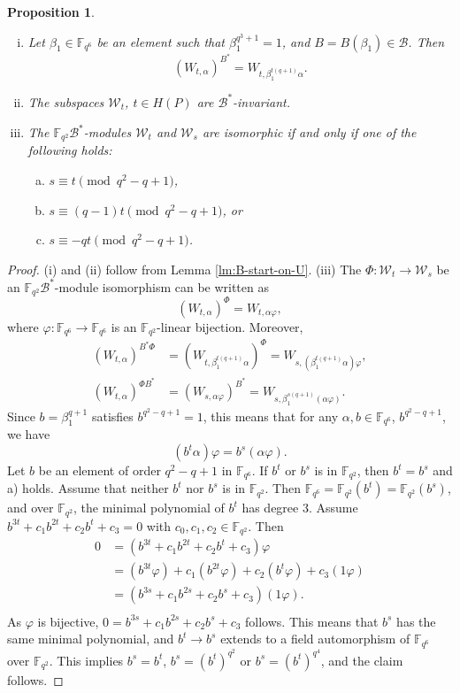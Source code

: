 \documentclass[a4paper]{amsart}
\theoremstyle{plain}
\newtheorem{proposition}[theorem]{Proposition}
\theoremstyle{definition}
\theoremstyle{remark}
\begin{document}
\begin{proposition}
\begin{enumerate}[(i)]
\item Let $\beta_1 \in \mathbb{F}_{q^6}$ be an element such that $\beta_1^{q^3+1}=1$, and $B=B(\beta_1) \in \mathcal{B}$. Then
\[(W_{t,\alpha})^{B^*} = W_{t,\beta_1^{t(q+1)}\alpha}.\]
\item The subspaces $\mathcal{W}_t$, $t\in H(P)$ are $\mathcal{B}^*$-invariant. 
\item The $\mathbb{F}_{q^2}\mathcal{B}^*$-modules $\mathcal{W}_t$ and $\mathcal{W}_s$ are isomorphic if and only if one of the following holds:
\begin{enumerate}[a)]
\item $s\equiv t \pmod{q^2-q+1}$, 
\item $s\equiv (q-1)t \pmod{q^2-q+1}$, or 
\item $s\equiv -qt \pmod{q^2-q+1}$. 
\end{enumerate}
\end{enumerate}
\end{proposition}
\begin{proof}
(i) and (ii) follow from Lemma \ref{lm:B-start-on-U}. (iii) The $\Phi:\mathcal{W}_t \to \mathcal{W}_s$ be an $\mathbb{F}_{q^2}\mathcal{B}^*$-module isomorphism can be written as
\[(W_{t,\alpha})^\Phi = W_{t,\alpha \varphi},\]
where $\varphi:\mathbb{F}_{q^6}\to \mathbb{F}_{q^6}$ is an $\mathbb{F}_{q^2}$-linear bijection. Moreover,
\begin{align*}
(W_{t,\alpha})^{B^*\Phi} & = (W_{t,\beta_1^{t(q+1)} \alpha})^\Phi = W_{s,(\beta_1^{t(q+1)}\alpha)\varphi}, \\
(W_{t,\alpha})^{\Phi B^*} & = (W_{s,\alpha\varphi})^{B^*} = W_{s,\beta_1^{s(q+1)}(\alpha\varphi)}.
\end{align*}
Since $b=\beta_1^{q+1}$ satisfies $b^{q^2-q+1}=1$, this means that for any $\alpha, b\in \mathbb{F}_{q^6}$, $b^{q^2-q+1}$, we have
\[(b^t \alpha) \varphi = b^s(\alpha\varphi).\]
Let $b$ be an element of order $q^2-q+1$ in $\mathbb{F}_{q^6}$. If $b^t$ or $b^s$ is in $\mathbb{F}_{q^2}$, then $b^t=b^s$ and a) holds. Assume that neither $b^t$ nor $b^s$ is in $\mathbb{F}_{q^2}$. Then $\mathbb{F}_{q^6}=\mathbb{F}_{q^2}(b^t)=\mathbb{F}_{q^2}(b^s)$, and over $\mathbb{F}_{q^2}$, the minimal polynomial of $b^t$ has degree $3$. Assume $b^{3t}+c_1b^{2t}+c_2b^t+c_3=0$ with $c_0,c_1,c_2\in \mathbb{F}_{q^2}$. Then
\begin{align*}
0&=(b^{3t}+c_1b^{2t}+c_2b^t+c_3)\varphi \\
&= (b^{3t}\varphi)+c_1(b^{2t}\varphi)+c_2(b^t\varphi)+c_3(1\varphi) \\
&= (b^{3s}+c_1b^{2s}+c_2b^s+c_3)(1\varphi). \\
\end{align*}
As $\varphi$ is bijective, $0=b^{3s}+c_1b^{2s}+c_2b^s+c_3$ follows. This means that $b^s$ has the same minimal polynomial, and $b^t \to b^s$ extends to a field automorphism of $\mathbb{F}_{q^6}$ over $\mathbb{F}_{q^2}$. This implies $b^s=b^t$, $b^s=(b^t)^{q^2}$ or $b^s=(b^t)^{q^4}$, and the claim follows. 
\end{proof}
\end{document}

